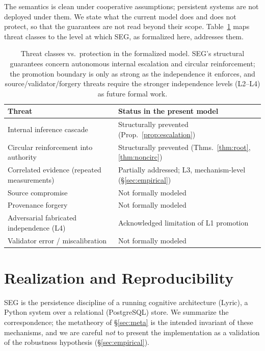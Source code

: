 \documentclass[11pt]{article}
\theoremstyle{plain}
\theoremstyle{definition}
\begin{document}
The semantics is clean under cooperative assumptions; persistent systems are not
deployed under them. We state what the current model does and does not protect,
so that the guarantees are not read beyond their scope. Table~\ref{tab:threat}
maps threat classes to the level at which SEG, as formalized here, addresses them.

\begin{table}[t]
\centering
\small
\begin{tabular}{l l}
\hline
Threat & Status in the present model\\
\hline
Internal inference cascade & Structurally prevented (Prop.~\ref{prop:escalation})\\
Circular reinforcement into authority & Structurally prevented (Thms.~\ref{thm:root},\ref{thm:noncirc})\\
Correlated evidence (repeated measurements) & Partially addressed; L3, mechanism-level (\S\ref{sec:empirical})\\
Source compromise & Not formally modeled\\
Provenance forgery & Not formally modeled\\
Adversarial fabricated independence (L4) & Acknowledged limitation of L1 promotion\\
Validator error / miscalibration & Not formally modeled\\
\hline
\end{tabular}
\caption{Threat classes vs.\ protection in the formalized model. SEG's structural
guarantees concern autonomous internal escalation and circular reinforcement; the
promotion boundary is only as strong as the independence it enforces, and
source/validator/forgery threats require the stronger independence levels
(L2--L4) as future formal work.}
\label{tab:threat}
\end{table}

\section{Realization and Reproducibility}
\label{sec:impl}

SEG is the persistence discipline of a running cognitive architecture (Lyric), a
Python system over a relational (PostgreSQL) store. We summarize the
correspondence; the metatheory of \S\ref{sec:meta} is the intended invariant of
these mechanisms, and we are careful \emph{not} to present the implementation as a
validation of the robustness hypothesis (\S\ref{sec:empirical}).
\end{document}

